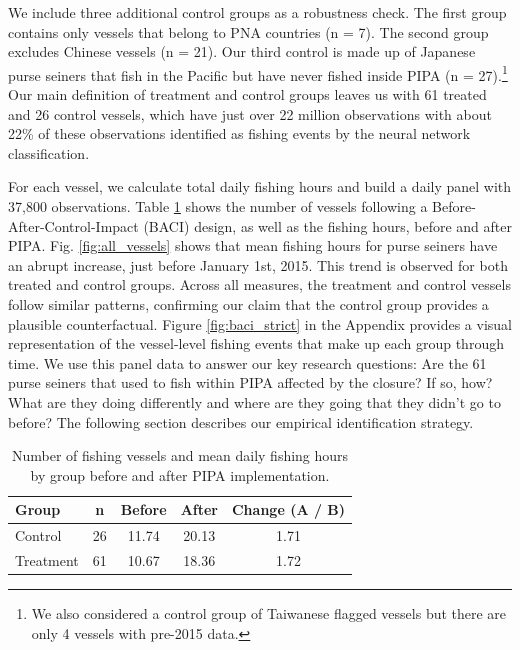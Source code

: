 \documentclass[11pt,english]{article}
\begin{document}
We include three additional control groups as a
robustness check. The first group contains only vessels that belong to PNA countries (n
= 7). The second group excludes Chinese vessels (n = 21). Our third control
is made up of Japanese purse seiners that fish in the Pacific but have
never fished inside PIPA (n =
27).\footnote{We also considered a control group of Taiwanese flagged vessels but there are only 4 vessels with pre-2015 data.}
Our main definition of treatment and control groups leaves us with 61 treated and 26
control vessels, which have just over 22 million
observations with about 22\% of these observations identified as fishing events by the neural network classification.

For each vessel, we calculate total daily fishing hours and build a daily panel
with 37,800 observations. Table \ref{tab:baci_n_s} shows the number
of vessels following a Before-After-Control-Impact (BACI) design, as well as the fishing hours, before
and after PIPA. Fig. \ref{fig:all_vessels} shows that mean fishing hours
for purse seiners have an abrupt increase, just before January 1st,
2015. This trend is observed for both treated and control groups. Across
all measures, the treatment and control vessels follow similar patterns,
confirming our claim that the control group provides a plausible
counterfactual. Figure \ref{fig:baci_strict} in the Appendix provides a visual
representation of the vessel-level fishing events that make up each
group through time. We use this panel data to answer our key research questions: 
Are the 61 purse seiners that used to fish within PIPA affected by the closure? If so, how?
What are they doing differently and where are they going that they didn't go to before?
The following section describes our empirical identification strategy.

\begin{table}[H]

\caption{\label{tab:unnamed-chunk-6}\label{tab:baci_n_s}Number of fishing vessels and mean daily fishing hours by group before and after PIPA implementation.}
\centering
\begin{tabular}[t]{lcccc}
\toprule
Group & n & Before & After & Change (A / B)\\
\midrule
Control & 26 & 11.74 & 20.13 & 1.71\\
Treatment & 61 & 10.67 & 18.36 & 1.72\\
\bottomrule
\end{tabular}
\end{table}
\end{document}

